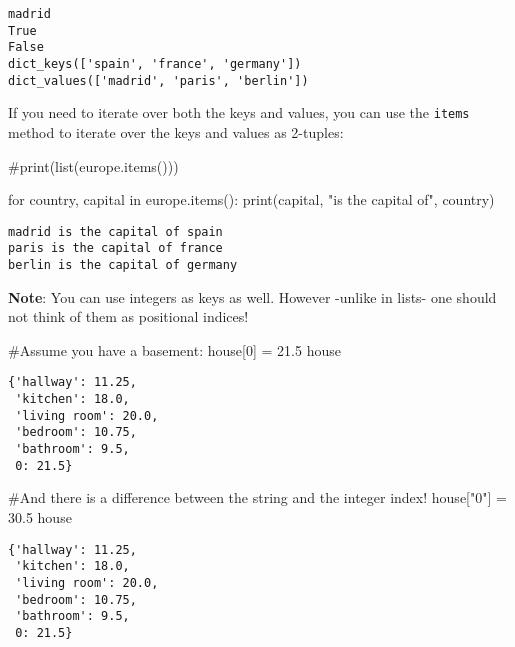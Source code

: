 \documentclass[
  letterpaper,
  DIV=11,
  numbers=noendperiod]{scrreprt}
\newenvironment{Shaded}{\begin{snugshade}}{\end{snugshade}}
\newcommand{\BuiltInTok}[1]{\textcolor[rgb]{0.00,0.23,0.31}{#1}}
\newcommand{\CommentTok}[1]{\textcolor[rgb]{0.37,0.37,0.37}{#1}}
\newcommand{\ControlFlowTok}[1]{\textcolor[rgb]{0.00,0.23,0.31}{#1}}
\newcommand{\DecValTok}[1]{\textcolor[rgb]{0.68,0.00,0.00}{#1}}
\newcommand{\FloatTok}[1]{\textcolor[rgb]{0.68,0.00,0.00}{#1}}
\newcommand{\KeywordTok}[1]{\textcolor[rgb]{0.00,0.23,0.31}{#1}}
\newcommand{\NormalTok}[1]{\textcolor[rgb]{0.00,0.23,0.31}{#1}}
\newcommand{\OperatorTok}[1]{\textcolor[rgb]{0.37,0.37,0.37}{#1}}
\newcommand{\StringTok}[1]{\textcolor[rgb]{0.13,0.47,0.30}{#1}}
\begin{document}
\begin{verbatim}
madrid
True
False
dict_keys(['spain', 'france', 'germany'])
dict_values(['madrid', 'paris', 'berlin'])
\end{verbatim}

If you need to iterate over both the keys and values, you can use the
\texttt{items} method to iterate over the keys and values as 2-tuples:

\begin{Shaded}
\begin{Highlighting}[]
\CommentTok{\#print(list(europe.items()))}

\ControlFlowTok{for}\NormalTok{ country, capital }\KeywordTok{in}\NormalTok{ europe.items():}
    \BuiltInTok{print}\NormalTok{(capital, }\StringTok{"is the capital of"}\NormalTok{, country)}
\end{Highlighting}
\end{Shaded}

\begin{verbatim}
madrid is the capital of spain
paris is the capital of france
berlin is the capital of germany
\end{verbatim}

\textbf{Note}: You can use integers as keys as well. However -unlike in
lists- one should not think of them as positional indices!

\begin{Shaded}
\begin{Highlighting}[]
\CommentTok{\#Assume you have a basement:}
\NormalTok{house[}\DecValTok{0}\NormalTok{] }\OperatorTok{=} \FloatTok{21.5}
\NormalTok{house}
\end{Highlighting}
\end{Shaded}

\begin{verbatim}
{'hallway': 11.25,
 'kitchen': 18.0,
 'living room': 20.0,
 'bedroom': 10.75,
 'bathroom': 9.5,
 0: 21.5}
\end{verbatim}

\begin{Shaded}
\begin{Highlighting}[]
\CommentTok{\#And there is a difference between the string and the integer index!}
\NormalTok{house[}\StringTok{"0"}\NormalTok{] }\OperatorTok{=} \FloatTok{30.5}
\NormalTok{house}
\end{Highlighting}
\end{Shaded}

\begin{verbatim}
{'hallway': 11.25,
 'kitchen': 18.0,
 'living room': 20.0,
 'bedroom': 10.75,
 'bathroom': 9.5,
 0: 21.5}
\end{verbatim}
\end{document}
